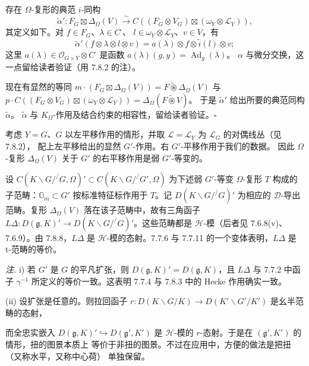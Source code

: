 
存在 $\Omega$-复形的典范 $i$-同构
\[
\tilde{\alpha}':F_{G}\boxtimes\Delta_{\Omega}(V)
\xrightarrow{\ \sim\ }C((F_{G}\otimes V_{G})\boxtimes(\omega_{Y}\otimes\mathcal{L}_{Y})),
\]
其定义如下。对 $f\in F_{G}$、$\lambda\in C^{\cdot}$、
$l\in\omega_{Y}\otimes\mathcal{L}_{Y}$、$v\in V$，有
\[
\tilde{\alpha}'(f\otimes\lambda\otimes l\otimes v)
=a(\lambda)\otimes f\otimes\tilde{i}(l)\otimes v;
\]
这里 $a(\lambda)\in\mathcal{O}_{G\times Y}\otimes C^{\cdot}$ 是函数
$a(\lambda)(g,y)=\operatorname{Ad}_{g}(\lambda)$。
$\alpha$ 与微分交换，这一点留给读者验证（用 7.8.2 的注）。

现在有显然的等同
$m\cdot(F_{G}\boxtimes\Delta_{\Omega}(V))=F\widetilde{\circledast}\Delta_{\Omega}(V)$
与
$p\cdot C((F_{G}\otimes V_{G})\boxtimes(\omega_{Y}\otimes\mathcal{L}_{Y}))
=\Delta_{\Omega}(F\widetilde{\circledast}V)$。
于是 $\tilde{\alpha}'$ 给出所要的典范同构 $\tilde{\alpha}$。
$\tilde{\alpha}$ 与 $K_{\Omega}$-作用及结合约束的相容性，留给读者验证。\hfill$\square$

 考虑 $Y=G$、$G$ 以左平移作用的情形，并取
$\mathcal{L}=\mathcal{L}_{Y}$ 为 $\mathcal{L}_{G}$ 的对偶线丛（见 7.8.2），
配上左平移给出的显然 $G'$-作用。右 $G'$-平移作用于我们的数据。
因此 $\Omega$-复形 $\Delta_{\Omega}(V)$ 关于 $G'$ 的右平移作用是弱 $G'$-等变的。

设 $C(K\backslash G/^{/}G,\Omega)'\subset C(K\backslash G/^{/}G',\Omega)$
为下述弱 $G'$-等变 $\Omega$-复形 $T$ 构成的子范畴：$\mathbb{G}_{m}\subset G'$
按标准特征标作用于 $T$。记 $D(K\backslash G/^{/}G)'$ 为相应的
$\mathcal{D}$-导出范畴。复形 $\Delta_{\Omega}(V)$ 落在该子范畴中，故有三角函子
$L\Delta:D(\mathfrak{g},K)'\to D(K\backslash G/^{/}G)'$。这些范畴都是
$\mathcal{H}$-模（后者见 7.6.8(v)、7.6.9）。由 7.8.8，$L\Delta$ 是
$\mathcal{H}$-模的态射。7.7.6 与 7.7.11 的一个变体表明，$L\Delta$ 是
t-范畴的等价。

 \emph{注.} i) 若 $G'$ 是 $G$ 的平凡扩张，则
$D(\mathfrak{g},K)'=D(\mathfrak{g},K)$，且 $L\Delta$ 与 7.7.2 中函子
$\gamma^{-1}$ 所定义的等价一致。这表明 7.7.4 与 7.8.3 中的 Hecke 作用确实一致。

(ii) 设扩张是任意的。则拉回函子
$r:D(K\backslash G/K)\to D(K'\backslash G'/K')$ 是幺半范畴的态射，


而全忠实嵌入 $D(\mathfrak{g},K)'\hookrightarrow D(\mathfrak{g}',K')$ 是
$\mathcal{H}$-模的 $r$-态射。于是在 $(\mathfrak{g}',K')$ 的情形，扭的图景本质上
等价于非扭的图景。不过在应用中，方便的做法是把扭（又称水平，又称中心荷）
单独保留。

